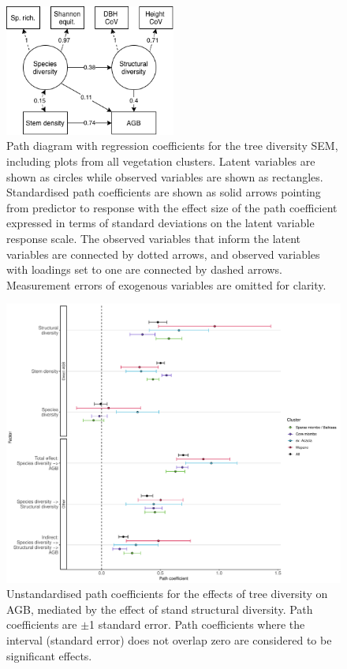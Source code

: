 \documentclass[11pt,a4paper]{article}
\begin{document}
\begin{figure}[H]
\centering
	\includegraphics[width=0.5\textwidth]{struc}
	\caption{Path diagram with regression coefficients for the tree diversity SEM, including plots from all vegetation clusters. Latent variables are shown as circles while observed variables are shown as rectangles. Standardised path coefficients are shown as solid arrows pointing from predictor to response with the effect size of the path coefficient expressed in terms of standard deviations on the latent variable response scale. The observed variables that inform the latent variables are connected by dotted arrows, and observed variables with loadings set to one are connected by dashed arrows. Measurement errors of exogenous variables are omitted for clarity.}
	\label{struc_mod}
\end{figure}

\begin{figure}[H]
\centering
	\includegraphics[width=\textwidth]{struc_model_slopes_all}
	\caption{Unstandardised path coefficients for the effects of tree diversity on AGB, mediated by the effect of stand structural diversity. Path coefficients are $\pm$1 standard error. Path coefficients where the interval (standard error) does not overlap zero are considered to be significant effects.}
	\label{struc_model_slopes_all}
\end{figure}
\end{document}
